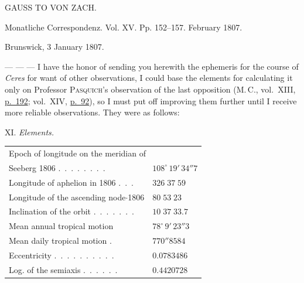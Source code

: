\begin{center}
GAUSS TO VON ZACH.
\end{center}

\begin{center}
Monatliche Correspondenz. Vol. XV. Pp. 152–157. February 1807.
\end{center}

\begin{flushright}
Brunswick, 3 January 1807.
\end{flushright}

\par\indent --- --- --- I have the honor of sending you herewith the ephemeris for the course of \emph{Ceres}
for want of other observations, I could base the elements for calculating it only on Professor
%
\textsc{Pasquich}’s observation of the last opposition (M.\,C., vol.~XIII, \href{https://www.digitale-sammlungen.de/en/view/bsb10538605?page=200}{p.~192}; vol.~XIV, \href{https://www.digitale-sammlungen.de/en/view/bsb10538606?page=102}{p.~92}), so I must put off improving them further until I receive more reliable observations.
They were as follows:

\begin{center}
XI. \emph{Elements.}
\end{center}

\begin{center}\begingroup
\fontsize{9}{11}\selectfont
\setlength{\tabcolsep}{3pt}\renewcommand{\arraystretch}{1.12}
\begin{tabular}{ll}
\multicolumn{2}{l}{Epoch of longitude on the meridian of} \\
\quad Seeberg 1806 .\ .\ .\ .\ .\ .\ .\ . & $108^\circ\,19'\,34''7$ \\
Longitude of aphelion in 1806 .\ .\ . & $326\;37\;59$ \\
Longitude of the ascending node$\cdot$1806  & $80\;53\;23$ \\
Inclination of the orbit .\ .\ .\ .\ .\ .\ . & $10\;37\;33.7$ \\
Mean annual tropical motion  & $78^\circ\,9'\,23''3$ \\
Mean daily tropical motion . & $770''8584$ \\
Eccentricity .\ .\ .\ .\ .\ .\ .\ .\ .\ . & $0.0783486$ \\
Log. of the semiaxis .\ .\ .\ .\ .\ . & $0.4420728$ \\
\end{tabular}\endgroup\end{center}

